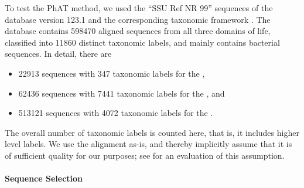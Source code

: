 To test the \acf{PhAT} method,
we used the ``SSU Ref NR 99'' sequences of the  database \citep{Quast2013} version 123.1
and the corresponding taxonomic framework \citep{Yilmaz2014}.
The database contains \num{598 470} aligned sequences from all three domains of life,
classified into \num{11 860} distinct taxonomic labels,
and mainly contains bacterial sequences.
In detail, there are
\begin{itemize}
    \item \num{ 22 913} sequences with \num{  347} taxonomic labels for the ,
    \item \num{ 62 436} sequences with \num{7 441} taxonomic labels for the , and
    \item \num{513 121} sequences with \num{4 072} taxonomic labels for the .
\end{itemize}
The overall number of taxonomic labels is counted here, that is, it includes higher level labels.
We use the  alignment as-is,
and thereby implicitly assume that it is of sufficient quality for our purposes;
see 
for an evaluation of this assumption.



\paragraph{Sequence Selection}
\label{ch:AutomaticTrees:sec:Evaluation:sub:ReferenceTreeSetup:par:SequenceSelection}

